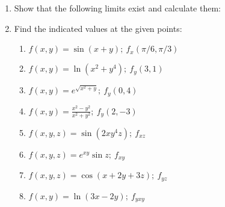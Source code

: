 \documentclass[journal,12pt,twocolumn]{IEEEtran}
\begin{document}
\begin{enumerate}
\begin{enumerate}[(i)]
\end{enumerate}

\item Show that the following limits exist and calculate them:

\begin{enumerate}[(i)]
\end{enumerate}

\item Find the indicated values at the given points:

\begin{enumerate}

\item
$ f(x,y)= \sin (x+y); \ f_x(\pi/6,\pi/3)$

\item
$ f(x,y)= \ln (x^2+y^4); \ f_y(3,1)$

\item
$ f(x,y)= e^{\sqrt{x^2+y}}; \ f_y(0,4)$

\item
$ f(x,y)=\frac{x^2-y^2}{x^2+y^2}; \ f_y(2,-3)$

\item
$ f(x,y,z)= \sin(2xy^4z); \ f_{xz}$

\item
$ f(x,y,z)= e^{xy} \sin z; \ f_{xy}$

\item
$ f(x,y,z)= \cos(x+2y+3z); \ f_{yz}$

\item
$ f(x,y)= \ln (3x-2y); \ f_{yxy}$

\end{enumerate}
\end{enumerate}
%
\end{document}
